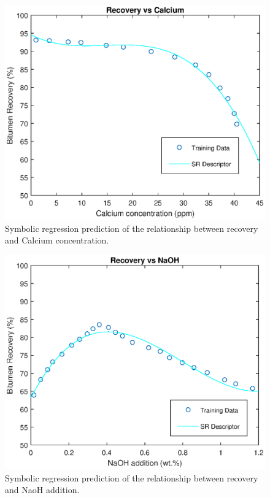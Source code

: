 \documentclass[final,5p,times,twocolumn]{elsarticle}
\begin{document}
\begin{figure}[!hptb]
	\centering
	\includegraphics[width=\linewidth,clip]{NIRS_Calcium.eps}
	\caption{Symbolic regression prediction of the relationship between recovery and Calcium concentration.}
	\label{fig:NIRS_Calcium}
\end{figure}


\begin{figure}[!hptb]
	\centering
	\includegraphics[width=\linewidth,clip]{NIRS_NaOH.eps}
	\caption{Symbolic regression prediction of the relationship between recovery and NaoH addition.}
	\label{fig:NIRS_NaOH}
\end{figure}
\end{document}
